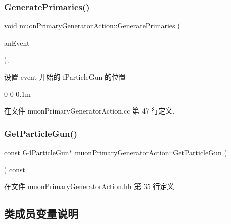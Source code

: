 \subsubsection{\texorpdfstring{Generate\+Primaries()}{GeneratePrimaries()}}
{\footnotesize\ttfamily void muon\+Primary\+Generator\+Action\+::\+Generate\+Primaries (\begin{DoxyParamCaption}\item[{G4\+Event $\ast$}]{an\+Event }\end{DoxyParamCaption})\hspace{0.3cm}{\ttfamily [override]}, {\ttfamily [virtual]}}



设置 event 开始的 f\+Particle\+Gun 的位置 

0 0 0.\+1m 

在文件 muon\+Primary\+Generator\+Action.\+cc 第 47 行定义.

\mbox{\label{classmuonPrimaryGeneratorAction_a2a8edec5c700a748aefbd2ec2a95157a}} 
\subsubsection{\texorpdfstring{Get\+Particle\+Gun()}{GetParticleGun()}}
{\footnotesize\ttfamily const G4\+Particle\+Gun$\ast$ muon\+Primary\+Generator\+Action\+::\+Get\+Particle\+Gun (\begin{DoxyParamCaption}{ }\end{DoxyParamCaption}) const\hspace{0.3cm}{\ttfamily [inline]}}



在文件 muon\+Primary\+Generator\+Action.\+hh 第 35 行定义.



\subsection{类成员变量说明}
\mbox{\label{classmuonPrimaryGeneratorAction_ab2af0b1b3691cf90bb30694eb1cb012f}} 
